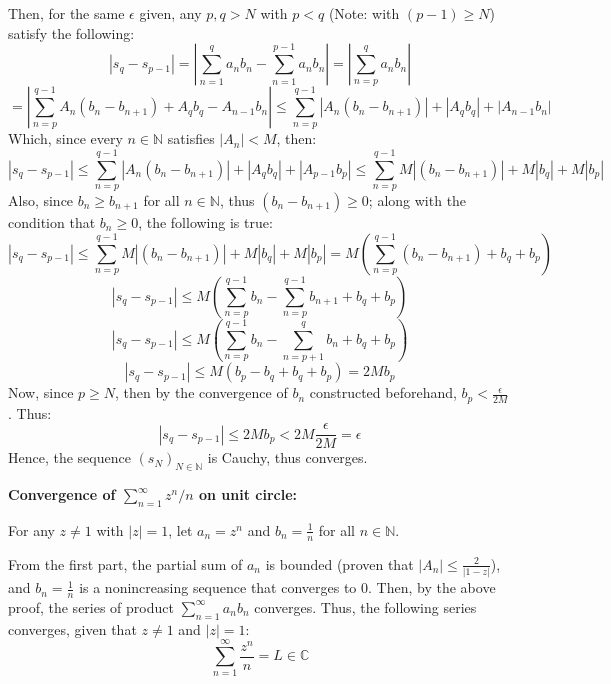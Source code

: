 \documentclass{article}
\begin{document}
Then, for the same $\epsilon$ given, any $p,q> N$ with $p<q$ (Note: with $(p-1)\geq N$) satisfy the following:
$$|s_q-s_{p-1}| = \left|\sum_{n=1}^{q}a_nb_n-\sum_{n=1}^{p-1}a_nb_n\right| = \left|\sum_{n=p}^{q}a_nb_n\right|$$
$$=\left|\sum_{n=p}^{q-1}A_n(b_n-b_{n+1})+A_qb_q-A_{n-1}b_{n}\right| \leq \sum_{n=p}^{q-1}|A_n(b_n-b_{n+1})|+|A_qb_q|+|A_{n-1}b_n|$$
Which, since every $n\in\mathbb{N}$ satisfies $|A_n|<M$, then:
$$|s_q-s_{p-1}| \leq \sum_{n=p}^{q-1}|A_n(b_n-b_{n+1})|+|A_qb_q|+|A_{p-1}b_p| \leq \sum_{n=p}^{q-1}M|(b_n-b_{n+1})|+M|b_q|+M|b_p|$$
Also, since $b_n\geq b_{n+1}$ for all $n\in\mathbb{N}$, thus $(b_n-b_{n+1})\geq 0$; along with the condition that $b_n\geq 0$, the following is true:
$$|s_q-s_{p-1}|\leq \sum_{n=p}^{q-1}M|(b_n-b_{n+1})|+M|b_q|+M|b_p| = M\left(\sum_{n=p}^{q-1}(b_n-b_{n+1})+b_q+b_p\right)$$ 
$$|s_q-s_{p-1}|\leq M\left(\sum_{n=p}^{q-1}b_n - \sum_{n=p}^{q-1}b_{n+1}+b_q+b_p\right)$$
$$|s_q-s_{p-1}|\leq M\left(\sum_{n=p}^{q-1}b_n - \sum_{n=p+1}^{q}b_{n}+b_q+b_p\right)$$
$$|s_q-s_{p-1}|\leq M(b_p-b_q+b_q+b_p) = 2Mb_p$$
Now, since $p\geq N$, then by the convergence of $b_n$ constructed beforehand, $b_p<\frac{\epsilon}{2M}$. Thus:
$$|s_q-s_{p-1}|\leq 2Mb_p < 2M\frac{\epsilon}{2M} = \epsilon$$
Hence, the sequence $(s_N)_{N\in\mathbb{N}}$ is Cauchy, thus converges.

\hfill

\textbf{Convergence of $\sum_{n=1}^{\infty}z^n/n$ on unit circle:}

For any $z\neq 1$ with $|z|=1$, let $a_n=z^n$ and $b_n=\frac{1}{n}$ for all $n\in\mathbb{N}$.

From the first part, the partial sum of $a_n$ is bounded (proven that $|A_n|\leq \frac{2}{|1-z|}$), and $b_n=\frac{1}{n}$ is a nonincreasing sequence
that converges to $0$. Then, by the above proof, the series of product $\sum_{n=1}^{\infty}a_nb_n$ converges. Thus, the following series converges, given that $z\neq 1$ and $|z|=1$:
$$\sum_{n=1}^{\infty}\frac{z^n}{n}=L\in\mathbb{C}$$
\end{document}
